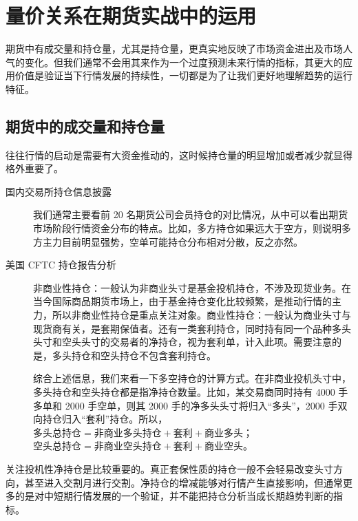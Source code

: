 \chapter{量价关系在期货实战中的运用}
期货中有成交量和持仓量，尤其是持仓量，更真实地反映了市场资金进出及市场人气的变化。但我们通常不会用其来作为一个过度预测未来行情的指标，其更大的应用价值是验证当下行情发展的持续性，一切都是为了让我们更好地理解趋势的运行特征。
\section{期货中的成交量和持仓量}
往往行情的启动是需要有大资金推动的，这时候持仓量的明显增加或者减少就显得格外重要了。

\begin{description}
    \item[国内交易所持仓信息披露]我们通常主要看前 20 名期货公司会员持仓的对比情况，从中可以看出期货市场阶段行情资金分布的特点。比如，多方持仓如果远大于空方，则说明多方主力目前明显强势，空单可能持仓分布相对分散，反之亦然。
    \item[美国 CFTC 持仓报告分析]非商业性持仓：一般认为非商业头寸是基金投机持仓，不涉及现货业务。在当今国际商品期货市场上，由于基金持仓变化比较频繁，是推动行情的主力，所以非商业性持仓是重点关注对象。商业性持仓：一般认为商业头寸与现货商有关，是套期保值者。还有一类套利持仓，同时持有同一个品种多头头寸和空头头寸的交易者的净持仓，视为套利单，计入此项。需要注意的是，多头持仓和空头持仓不包含套利持仓。

    综合上述信息，我们来看一下多空持仓的计算方式。在非商业投机头寸中，多头持仓和空头持仓都是指净持仓数量。比如，某交易商同时持有 4000 手多单和 2000 手空单，则其 2000 手的净多头头寸将归入“多头”，2000 手双向持仓归入“套利”持仓。所以，$\text{多头总持仓}=\text{非商业多头持仓}+\text{套利}+\text{商业多头}$；$\text{空头总持仓}=\text{非商业空头持仓}+\text{套利}+\text{商业空头}$。
\end{description}

关注投机性净持仓是比较重要的。真正套保性质的持仓一般不会轻易改变头寸方向，甚至进入交割月进行交割。净持仓的增减能够对行情产生直接影响，但通常更多的是对中短期行情发展的一个验证，并不能把持仓分析当成长期趋势判断的指标。